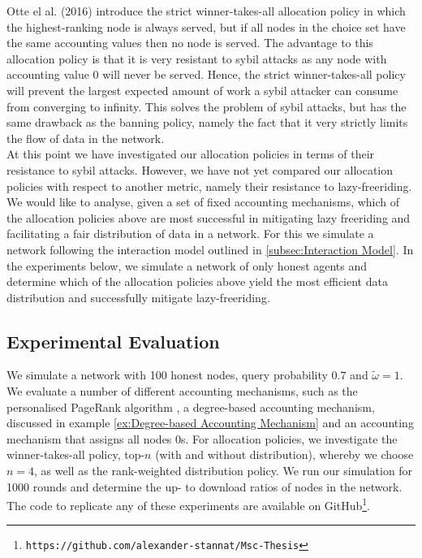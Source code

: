 \noindent{}Otte el al. (2016) introduce the strict winner-takes-all allocation policy in which the highest-ranking node is always served, but if all nodes in the choice set have the same accounting values then no node is served. The advantage to this allocation policy is that it is very resistant to sybil attacks as any node with accounting value $0$ will never be served. Hence, the strict winner-takes-all policy will prevent the largest expected amount of work a sybil attacker can consume from converging to infinity. This solves the problem of sybil attacks, but has the same drawback as the banning policy, namely the fact that it very strictly limits the flow of data in the network. \vspace{1em}\\

\noindent{}At this point we have investigated our allocation policies in terms of their resistance to sybil attacks. However, we have not yet compared our allocation policies with respect to another metric, namely their resistance to lazy-freeriding. We would like to analyse, given a set of fixed accounting mechanisms, which of the allocation policies above are most successful in mitigating lazy freeriding and facilitating a fair distribution of data in a network. For this we simulate a network following the interaction model outlined in \ref{subsec:Interaction Model}. In the experiments below, we simulate a network of only honest agents and determine which of the allocation policies above yield the most efficient data distribution and successfully mitigate lazy-freeriding.\vspace{1em}\\


\subsection{Experimental Evaluation}
\label{subsec:Experimental Evaluation}
\noindent{}We simulate a network with 100 honest nodes, query probability $0.7$ and $\tilde{\omega}=1$. We evaluate a number of different accounting mechanisms, such as the personalised PageRank algorithm \cite{A Random Walk Based Trust Ranking in Distributed Systems}, a degree-based accounting mechanism, discussed in example \ref{ex:Degree-based Accounting Mechanism} and an accounting mechanism that assigns all nodes $0$s. For allocation policies, we investigate the winner-takes-all policy, top-$n$ (with and without distribution), whereby we choose $n=4$, as well as the rank-weighted distribution policy. We run our simulation for 1000 rounds and determine the up- to download ratios of nodes in the network. The code to replicate any of these experiments are available on GitHub\footnote{\texttt{https://github.com/alexander-stannat/Msc-Thesis}}. \vspace{1em}\\

